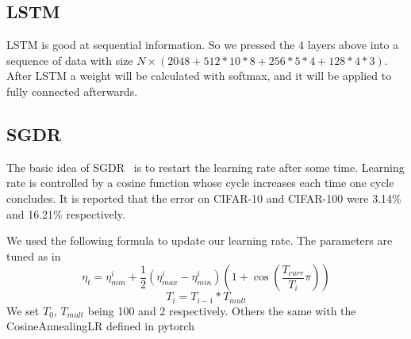 \documentclass[conference,compsoc]{IEEEtran}
\begin{document}
\subsection{LSTM}
\par
LSTM is good at sequential information. So we pressed the 4 layers above into a sequence of data with size $N\times(2048+512*10*8+256*5*4+128*4*3)$. After LSTM a weight will be calculated with softmax, and it will be applied to fully connected afterwards.

\subsection{SGDR}
The basic idea of SGDR~\cite{SGDR} is to restart the learning rate after some time. Learning rate is controlled by a cosine function whose cycle increases each time one cycle concludes. It is reported that the error on CIFAR-10 and CIFAR-100 were 3.14\% and 16.21\% respectively. 
\par We used the following formula to update our learning rate. The parameters are tuned as in \cite{SGDR}
$$ \eta_t = \eta_{min}^i + \frac{1}{2}(\eta_{max}^i-\eta_{min}^i)(1 + \cos(\frac{T_{curr}}{T_i}\pi))$$
$$ T_{i} = T_{i-1} * T_{mult} $$
We set $T_0$, $T_{mult}$ being 100 and 2 respectively. Others the same with the CosineAnnealingLR defined in pytorch
\end{document}
